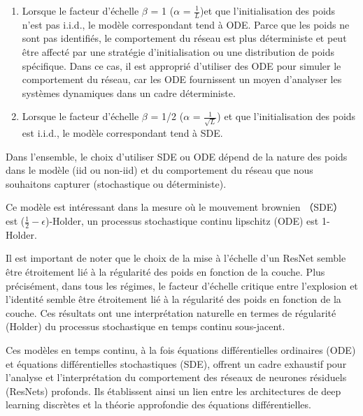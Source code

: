 \begin{enumerate}
    \item Lorsque le facteur d'échelle $\beta$ = 1 ($\alpha$ = $\frac{1}{L}$)et que l'initialisation des poids n'est pas i.i.d., le modèle correspondant tend à ODE.
    Parce que les poids ne sont pas identifiés, le comportement du réseau est plus déterministe et peut être affecté par une stratégie d'initialisation ou une distribution de poids spécifique. Dans ce cas, il est approprié d'utiliser des ODE pour simuler le comportement du réseau, car les ODE fournissent un moyen d'analyser les systèmes dynamiques dans un cadre déterministe.

    \item Lorsque le facteur d'échelle $\beta$ = 1/2 ($\alpha$ = $\frac{1}{\sqrt{L}}$) et que l'initialisation des poids est i.i.d., le modèle correspondant tend à SDE.
\end{enumerate}

Dans l'ensemble, le choix d'utiliser SDE ou ODE dépend de la nature des poids dans le modèle (iid ou non-iid) et du comportement du réseau que nous souhaitons capturer (stochastique ou déterministe).

Ce modèle est intéressant dans la mesure où le mouvement brownien （SDE） est ($\frac{1}{2}-\epsilon$)-Holder, un processus stochastique continu lipschitz (ODE) est 1-Holder.

Il est important de noter que le choix de la mise à l'échelle d'un ResNet semble être étroitement lié à la régularité des poids en fonction de la couche. Plus précisément, dans tous les régimes, le facteur d'échelle critique entre l'explosion et l'identité semble être étroitement lié à la régularité des poids en fonction de la couche. Ces résultats ont une interprétation naturelle en termes de régularité (Holder) du processus stochastique en temps continu sous-jacent.

Ces modèles en temps continu, à la fois équations différentielles ordinaires (ODE) et équations différentielles stochastiques (SDE), offrent un cadre exhaustif pour l'analyse et l'interprétation du comportement des réseaux de neurones résiduels (ResNets) profonds. Ils établissent ainsi un lien entre les architectures de deep learning discrètes et la théorie approfondie des équations différentielles.
